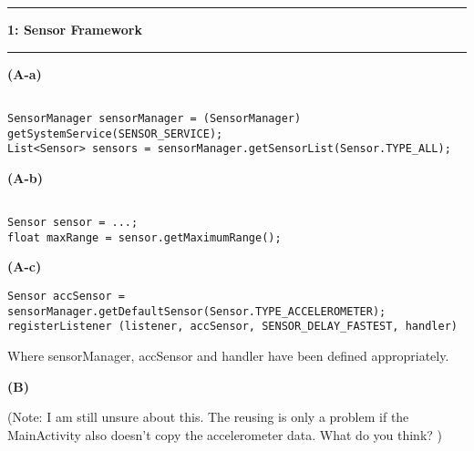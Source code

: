 \documentclass[11pt]{article}
\newcommand\question[2]{\vspace{.25in}\hrule\textbf{#1: #2}\vspace{.5em}\hrule\vspace{.10in}}
\renewcommand\part[1]{\vspace{.10in}\textbf{(#1)}}
\begin{document}
\raggedright

\newcommand\NAME{Lukas, Young, Vincent}  %

\question{1}{Sensor Framework}

\part{A-a}

\begin{small}
\begin{lstlisting}[frame=single]

SensorManager sensorManager = (SensorManager) getSystemService(SENSOR_SERVICE);
List<Sensor> sensors = sensorManager.getSensorList(Sensor.TYPE_ALL);
\end{lstlisting}
\end{small}

\part{A-b}

\begin{small}
\begin{lstlisting}[frame=single]

Sensor sensor = ...;
float maxRange = sensor.getMaximumRange();
\end{lstlisting}
\end{small}

\part{A-c}

\begin{small}
\begin{lstlisting}[frame=single]
Sensor accSensor = sensorManager.getDefaultSensor(Sensor.TYPE_ACCELEROMETER);
registerListener (listener, accSensor, SENSOR_DELAY_FASTEST, handler)
\end{lstlisting}
\end{small}

Where sensorManager, accSensor and handler have been defined appropriately.

\part{B}

(Note: I am still unsure about this. The reusing is only a problem if the MainActivity also doesn't copy the accelerometer data. What do you think? )
\end{document}
